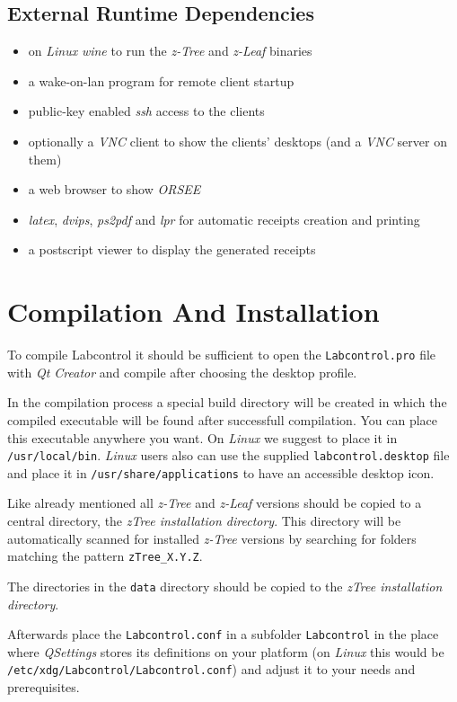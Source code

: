\documentclass[a4paper,10pt]{article}
\begin{document}
\subsection{External Runtime Dependencies}

\begin{itemize}
  \item on \emph{Linux} \emph{wine} to run the \emph{z-Tree} and \emph{z-Leaf} binaries
  \item a wake-on-lan program for remote client startup
  \item public-key enabled \emph{ssh} access to the clients
  \item optionally a \emph{VNC} client to show the clients' desktops (and a \emph{VNC} server on them)
  \item a web browser to show \emph{ORSEE}
  \item \emph{latex}, \emph{dvips}, \emph{ps2pdf} and \emph{lpr} for automatic receipts creation and printing
  \item a postscript viewer to display the generated receipts
\end{itemize}

\section{Compilation And Installation}

To compile Labcontrol it should be sufficient to open the \texttt{Labcontrol.pro} file with \emph{Qt Creator} and compile after choosing the desktop profile.

In the compilation process a special build directory will be created in which the compiled executable will be found after successfull compilation. You can place this executable anywhere you want. On \emph{Linux} we suggest to place it in \texttt{/usr/local/bin}. \emph{Linux} users also can use the supplied \texttt{labcontrol.desktop} file and place it in \texttt{/usr/share/applications} to have an accessible desktop icon.

Like already mentioned all \emph{z-Tree} and \emph{z-Leaf} versions should be copied to a central directory, the \emph{zTree installation directory}. This directory will be automatically scanned for installed \emph{z-Tree} versions by searching for folders matching the pattern \texttt{zTree\_X.Y.Z}.

The directories in the \texttt{data} directory should be copied to the \emph{zTree installation directory}.

Afterwards place the \texttt{Labcontrol.conf} in a subfolder \texttt{Labcontrol} in the place where \emph{QSettings} stores its definitions on your platform (on \emph{Linux} this would be \texttt{/etc/xdg/Labcontrol/Labcontrol.conf}) and adjust it to your needs and prerequisites.
\end{document}
